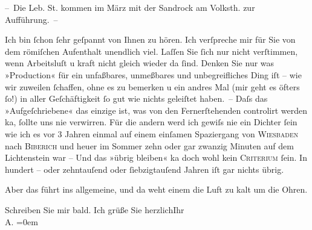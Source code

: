 \pstart
           – Die Leb. St. kommen im März mit
               der Sandrock am Volksth. zur Aufführung. –\pend
           
\pstart
           Ich bin{ }ſchon{ }ſehr geſpannt von Ihnen zu hören. Ich verſpreche mir für Sie von dem
                  römiſchen Aufenthalt unendlich viel. Laſſen
               Sie{ }ſich nur nicht verſtimmen, wenn {\pb}Arbeitsluſt u kraft
               nicht gleich wieder da{ }ſind. Denken Sie nur was »Production« für ein unfaßbares,
               unmeßbares und unbegreifliches Ding iſt – wie wir zuweilen{ }ſchaffen, ohne es zu
               bemerken u ein andres Mal (mir geht es öfters{ }ſo!) in aller Geſchäftigkeit{ }ſo gut wie
               nichts geleiſtet haben. – Daſs das »Aufgeſchriebene« das einzige ist, was von den
               Fernerſtehenden controlirt werden ka{\geminationn},{ }ſollte uns nie
               verwirren. Für die {\pb}andern werd ich gewiſs nie ein
               Dichter{ }ſein wie ich es vor 3 Jahren einmal auf einem einſamen Spaziergang von \textsc{Wiesbaden} nach \textsc{Biberich} und heuer im Sommer zehn oder gar zwanzig Minuten auf dem Lichtenstein war – Und das »übrig bleiben« ka{\geminationn} doch wohl kein \textsc{Criterium}{ }ſein. In hundert – oder zehntauſend oder{ }ſiebzigtauſend Jahren iſt gar nichts {\pb}übrig.\pend
           
\pstart
           Aber das führt ins allgemeine, und da weht einem die Luft zu kalt um die Ohren.\pend
           
\pstart
           Schreiben Sie mir bald. Ich grüße Sie herzlich\hspace*{1.5em}Ihr{\\[\baselineskip]}\spacefill\mbox{A.}\pend
           \leftskip=0em{}\endnumbering{}  \newcommand{\dateiname}{L01238}\newcommand{\titel}{Arthur Schnitzler an Hugo von Hofmannsthal, 7. 10. 1902}\newcommand{\editorInnen}{Herausgegeben von Martin Anton Müller}
